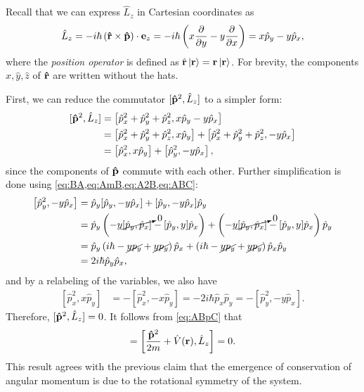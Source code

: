 Recall that we can express $\hat{L}_z$ in Cartesian coordinates as
\begin{align}\label{eq:Lz_cartesian}
    \hat{L}_z = -i\hbar \left( \mathbf{\hat{r}}\times\mathbf{\hat{p}} \right)\cdot\mathbf{e}_z = -i\hbar\left(x\frac{\partial}{\partial y} - y\frac{\partial}{\partial x}\right) = x \hat{p}_y - y \hat{p}_x,
\end{align}
where the \textit{position operator} is defined as $\hat{\mathbf{r}}\ket{\mathbf{r}} = \mathbf{r}\ket{\mathbf{r}}$. For brevity, the components $\hat{x}, \hat{y}, \hat{z}$ of $\mathbf{\hat{r}}$ are written without the hats.

First, we can reduce the commutator $[\mathbf{\hat{p}}^2,\hat{L}_z]$ to a simpler form:
\begin{align}
    \begin{split}        
    [\mathbf{\hat{p}}^2,\hat{L}_z]
        &= \left[ \hat{p}_x^2 + \hat{p}_y^2 + \hat{p}_z^2, x \hat{p}_y - y \hat{p}_x\right] \\
        &= \left[ \hat{p}_x^2 + \hat{p}_y^2 + \hat{p}_z^2, x \hat{p}_y \right] + \left[ \hat{p}_x^2 + \hat{p}_y^2 + \hat{p}_z^2, -y \hat{p}_x \right] \\
        &= \left[ \hat{p}_x^2, x \hat{p}_y \right] + \left[ \hat{p}_y^2, -y \hat{p}_x \right],
    \end{split}
\end{align}
since the components of $\mathbf{\hat{p}}$ commute with each other. Further simplification is done using \cref{eq:BA,eq:AmB,eq:A2B,eq:ABC}:
\begin{align}
    \begin{split}        
    \left[ \hat{p}_y^2, -y \hat{p}_x \right]
        &= \hat{p}_y [\hat{p}_y, -y \hat{p}_x ] + [\hat{p}_y, -y \hat{p}_x ]\hat{p}_y \\
        &= \hat{p}_y \left( -y \cancelto{0}{[\hat{p}_y, \hat{p}_x ]} - [\hat{p}_y, y] \hat{p}_x \right) + \left( -y \cancelto{0}{[\hat{p}_y, \hat{p}_x ]} - [\hat{p}_y, y] \hat{p}_x \right)\hat{p}_y \\
        &= \hat{p}_y \left( i\hbar - \cancel{yp_y} + \cancel{yp_y} \right) \hat{p}_x + \left( i\hbar - \cancel{yp_y} + \cancel{yp_y} \right) \hat{p}_x\hat{p}_y \\
        &= 2i\hbar \hat{p}_y \hat{p}_x,
    \end{split}
\end{align}
and by a relabeling of the variables, we also have
\begin{align}
    \left[ \hat{p}_x^2, x \hat{p}_y \right] &= -\left[ \hat{p}_x^2, -x \hat{p}_y \right] = -2i\hbar \hat{p}_x \hat{p}_y = -\left[ \hat{p}_y^2, -y \hat{p}_x \right].
\end{align}
Therefore, $[\mathbf{\hat{p}}^2,\hat{L}_z] = 0$. It follows from \cref{eq:ABpC} that
\begin{align}
    [\hat{H},\hat{L}_z] = \left[ \frac{\vh{p}^2}{2m}  + \hat{V}(\vec{r}), \hat{L}_z \right] = 0.
\end{align}
This result agrees with the previous claim that the emergence of conservation of angular momentum is due to the rotational symmetry of the system.

